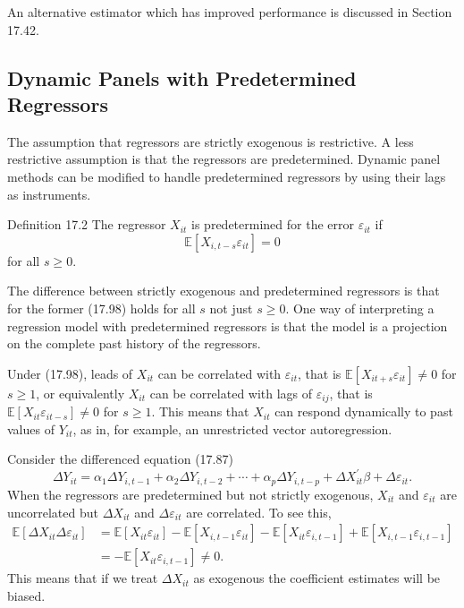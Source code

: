 \documentclass[10pt]{article}
\begin{document}
An alternative estimator which has improved performance is discussed in Section 17.42.

\subsection{Dynamic Panels with Predetermined Regressors}
The assumption that regressors are strictly exogenous is restrictive. A less restrictive assumption is that the regressors are predetermined. Dynamic panel methods can be modified to handle predetermined regressors by using their lags as instruments.

Definition 17.2 The regressor $X_{i t}$ is predetermined for the error $\varepsilon_{i t}$ if
$$
\mathbb{E}\left[X_{i, t-s} \varepsilon_{i t}\right]=0
$$
for all $s \geq 0$.

The difference between strictly exogenous and predetermined regressors is that for the former (17.98) holds for all $s$ not just $s \geq 0$. One way of interpreting a regression model with predetermined regressors is that the model is a projection on the complete past history of the regressors.

Under (17.98), leads of $X_{i t}$ can be correlated with $\varepsilon_{i t}$, that is $\mathbb{E}\left[X_{i t+s} \varepsilon_{i t}\right] \neq 0$ for $s \geq 1$, or equivalently $X_{i t}$ can be correlated with lags of $\varepsilon_{i j}$, that is $\mathbb{E}\left[X_{i t} \varepsilon_{i t-s}\right] \neq 0$ for $s \geq 1$. This means that $X_{i t}$ can respond dynamically to past values of $Y_{i t}$, as in, for example, an unrestricted vector autoregression.

Consider the differenced equation (17.87)
$$
\Delta Y_{i t}=\alpha_{1} \Delta Y_{i, t-1}+\alpha_{2} \Delta Y_{i, t-2}+\cdots+\alpha_{p} \Delta Y_{i, t-p}+\Delta X_{i t}^{\prime} \beta+\Delta \varepsilon_{i t} .
$$
When the regressors are predetermined but not strictly exogenous, $X_{i t}$ and $\varepsilon_{i t}$ are uncorrelated but $\Delta X_{i t}$ and $\Delta \varepsilon_{i t}$ are correlated. To see this,
$$
\begin{aligned}
\mathbb{E}\left[\Delta X_{i t} \Delta \varepsilon_{i t}\right] &=\mathbb{E}\left[X_{i t} \varepsilon_{i t}\right]-\mathbb{E}\left[X_{i, t-1} \varepsilon_{i t}\right]-\mathbb{E}\left[X_{i t} \varepsilon_{i, t-1}\right]+\mathbb{E}\left[X_{i, t-1} \varepsilon_{i, t-1}\right] \\
&=-\mathbb{E}\left[X_{i t} \varepsilon_{i, t-1}\right] \neq 0 .
\end{aligned}
$$
This means that if we treat $\Delta X_{i t}$ as exogenous the coefficient estimates will be biased.
\end{document}
